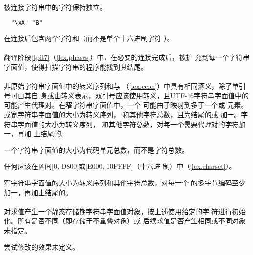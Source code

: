 被连接字符串中的字符保持独立。

\begin{example}
  \begin{lstlisting}
  "\xA" "B"
  \end{lstlisting}
  在连接后包含两个字符和（而不是单个十六进制字符
  ）。
\end{example}

\paragraph{} %
翻译阶段\ref{tpit7}（\ref{lex.phases}）中，在必要的连接完成后，被扩
充到每一个字符串字面值，使得扫描字符串的程序能找到其结尾。

\paragraph{} %
非原始字符串字面值中的转义序列和与
（\ref{lex.ccon}）中具有相同涵义，除了单引号可由其自
身或由转义表示，双引号应该使用\nt{\bs}转义，且UTF-16字符串字面值中的
可能产生代理对。在窄字符串字面值中，一个
可能由于映射到多于一个或
元素。或宽字符串字面值的大小为转义序列，
和其他字符总数，且为结尾的或
加一。字符串字面值的大小为转义序列，
和其他字符总数，对每一个需要代理对的字符加一，再加
上结尾的。

\begin{note}
  一个字符串字面值的大小为代码单元总数，而不是字符总数。
\end{note}

\begin{note}
  任何应该在区间[0, D800]或[E000, 10FFFF]（十六进
  制）中（\ref{lex.charset}）。
\end{note}

窄字符串字面值的大小为转义序列和其他字符总数，对每一个
的多字节编码至少加一，再加上结尾的。

\paragraph{} %
对求值产生一个静态存储期字符串字面值对象，按上述使用给定的字
符进行初始化。所有是否不同（即存储于不重叠对象）或
后续求值是否产生相同或不同对象未指定。

\begin{note}
  尝试修改的效果未定义。
\end{note}
